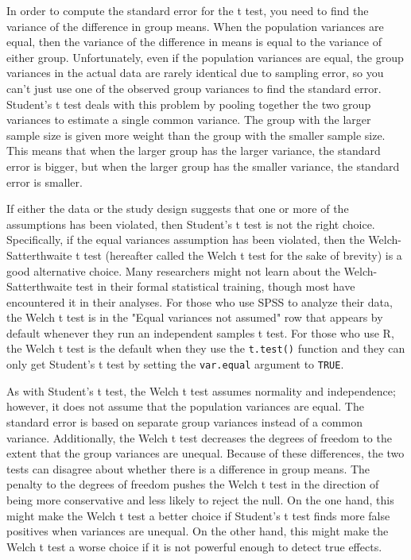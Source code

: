 \documentclass[man,a4paper,noextraspace,apacite]{apa6}\usepackage[]{graphicx}\usepackage[]{color}
\begin{document}
    In order to compute the standard error for the t test, you need to find the variance of the difference in group means. When the population variances are equal, then the variance of the difference in means is equal to the variance of either group. Unfortunately, even if the population variances are equal, the group variances in the actual data are rarely identical due to sampling error, so you can't just use one of the observed group variances to find the standard error. Student's t test deals with this problem by pooling together the two group variances to estimate a single common variance. The group with the larger sample size is given more weight than the group with the smaller sample size. This means that when the larger group has the larger variance, the standard error is bigger, but when the larger group has the smaller variance, the standard error is smaller.

    If either the data or the study design suggests that one or more of the assumptions has been violated, then Student's t test is not the right choice. Specifically, if the equal variances assumption has been violated, then the Welch-Satterthwaite t test (hereafter called the Welch t test for the sake of brevity) is a good alternative choice. Many researchers might not learn about the Welch-Satterthwaite test in their formal statistical training, though most have encountered it in their analyses. For those who use SPSS to analyze their data, the Welch t test is in the "Equal variances not assumed" row that appears by default whenever they run an independent samples t test. For those who use R, the Welch t test is the default when they use the \texttt{t.test()} function and they can only get Student's t test by setting the \texttt{var.equal} argument to \texttt{TRUE}.
    
        As with Student's t test, the Welch t test assumes normality and independence; however, it does not assume that the population variances are equal. The standard error is based on separate group variances instead of a common variance. Additionally, the Welch t test decreases the degrees of freedom to the extent that the group variances are unequal. Because of these differences, the two tests can disagree about whether there is a difference in group means. The penalty to the degrees of freedom pushes the Welch t test in the direction of being more conservative and less likely to reject the null. On the one hand, this might make the Welch t test a better choice if Student's t test finds more false positives when variances are unequal. On the other hand, this might make the Welch t test a worse choice if it is not powerful enough to detect true effects. 
        
\end{document}
